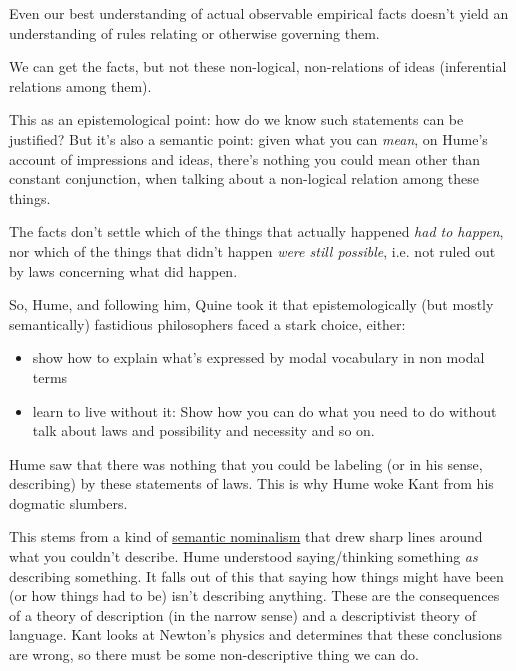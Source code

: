 Even our best understanding of actual observable empirical facts doesn't yield an understanding of rules relating or otherwise governing them.

We can get the facts, but not these non-logical, non-relations of ideas (inferential relations among them).

This as an epistemological point: how do we know such statements can be justified? But it's also a semantic point: given what you can \emph{mean}, on Hume's account of impressions and ideas, there's nothing you could mean other than constant conjunction, when talking about a non-logical relation among these things.

The facts don't settle which of the things that actually happened \emph{had to happen}, nor which of the things that didn't happen \emph{were still possible}, i.e. not ruled out by laws concerning what did happen.

So, Hume, and following him, Quine took it that epistemologically (but mostly semantically) fastidious philosophers faced a stark choice, either:
\begin{itemize}
\item show how to explain what's expressed by modal vocabulary in non modal terms
\item learn to live without it: Show how you can do what you need to do without talk about laws and possibility and necessity and so on.
\end{itemize}

Hume saw that there was nothing that you could be labeling (or in his sense, describing) by these statements of laws. This is why Hume woke Kant from his dogmatic slumbers.

This stems from a kind of \href{doc/phil/People/Brandom/On Sellars/2009/Lecture04/Semantic Nominalism}{semantic nominalism} that drew sharp lines around what you couldn't describe. Hume understood saying/thinking something \emph{as} describing something. It falls out of this that saying how things might have been (or how things had to be) isn't describing anything. These are the consequences of a theory of description (in the narrow sense) and a descriptivist theory of language. Kant looks at Newton's physics and determines that these conclusions are wrong, so there must be some non-descriptive thing we can do.